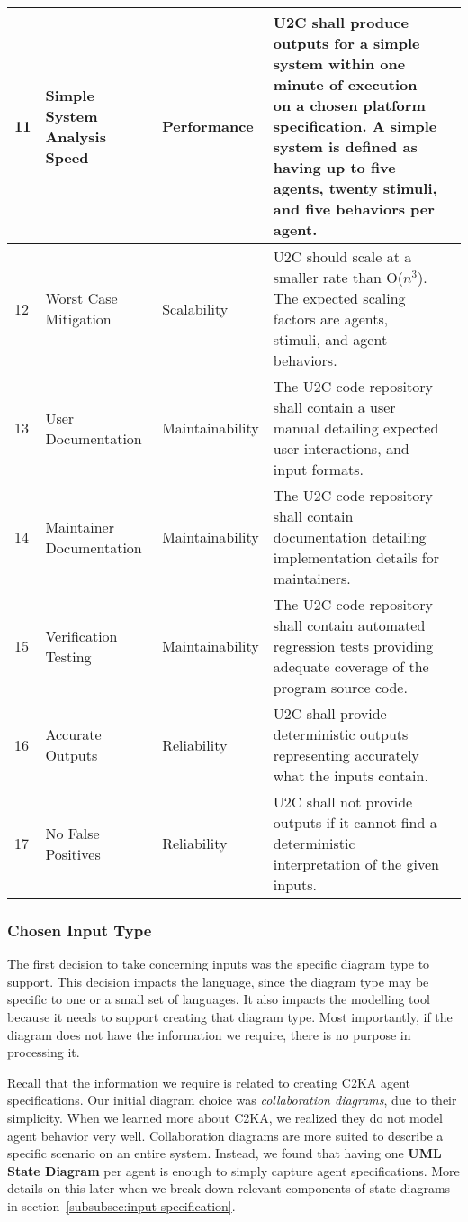 \begin{longtable}{|l|p{2.6cm}|l|p{4.5cm}|c|}
        \hline
        11 & Simple System Analysis Speed & Performance & U2C shall produce outputs for a simple system within one minute of execution on a chosen platform specification.
        A simple system is defined as having up to five agents, twenty stimuli, and five behaviors per agent. & \cellcolor{gray!30}  \\
        \hline
        12 & Worst Case Mitigation & Scalability & U2C should scale at a smaller rate than O($n^3$). The expected scaling factors are agents, stimuli, and agent behaviors. & \cellcolor{gray!30}  \\
        \hline
        13 & User Documentation & Maintainability & The U2C code repository shall contain a user manual detailing expected user interactions, and input formats. & \cellcolor{gray!30}  \\
        \hline
        14 & Maintainer Documentation & Maintainability & The U2C code repository shall contain documentation detailing implementation details for maintainers. & \cellcolor{green!30}  \\
        \hline
        15 & Verification Testing & Maintainability & The U2C code repository shall contain automated regression tests providing adequate coverage of the program source code. & \cellcolor{green!30}  \\
        \hline
        16 & Accurate Outputs & Reliability & U2C shall provide deterministic outputs representing accurately what the inputs contain. & \cellcolor{green!30}  \\
        \hline
        17 & No False Positives & Reliability & U2C shall not provide outputs if it cannot find a deterministic interpretation of the given inputs. & \cellcolor{green!30}  \\
        \hline
    \end{longtable}

    \subsubsection{Chosen Input Type}
    The first decision to take concerning inputs was the specific diagram type to support.
    This decision impacts the language, since the diagram type may be specific to one or a small set of languages.
    It also impacts the modelling tool because it needs to support creating that diagram type.
    Most importantly, if the diagram does not have the information we require, there is no purpose in processing it.

    Recall that the information we require is related to creating C2KA agent specifications.
    Our initial diagram choice was \textit{collaboration diagrams}, due to their simplicity. 
    When we learned more about C2KA, we realized they do not model agent behavior very well.
    Collaboration diagrams are more suited to describe a specific scenario on an entire system.
    Instead, we found that having one \textbf{UML State Diagram} per agent is enough to simply capture agent specifications.
    More details on this later when we break down relevant components of state diagrams in section~\ref{subsubsec:input-specification}.

